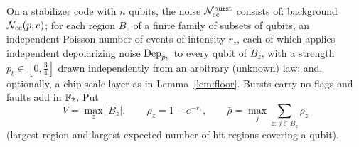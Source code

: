 \begin{definition}\label{def:cc-bursts}
On a stabilizer code with $n$ qubits, the noise $\mathcal{N}_{\rm cc}^{\rm burst}$ consists of: background $\mathcal{N}_{\rm cc}(p,e)$; for each region $B_z$ of a finite family of subsets of qubits, an independent Poisson number of events of intensity $r_z$, each of which applies independent depolarizing noise $\mathrm{Dep}_{p_b}$ to every qubit of $B_z$, with a strength $p_b\in[0,\tfrac34]$ drawn independently from an arbitrary (unknown) law; and, optionally, a chip-scale layer as in Lemma~\ref{lem:floor}. Bursts carry no flags and faults add in $\mathbb{F}_2$. Put
\[
V=\max_z|B_z|,\qquad \rho_z=1-e^{-r_z},\qquad \bar\rho=\max_j\sum_{z:\,j\in B_z}\rho_z
\]
(largest region and largest expected number of hit regions covering a qubit).
\end{definition}

